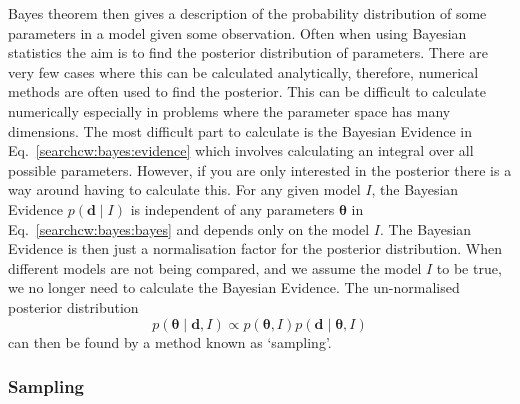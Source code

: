 Bayes theorem then gives a description of the probability distribution of some
parameters in a model given some observation.  Often when using Bayesian
statistics the aim is to find the posterior distribution of parameters.  There are
very few cases where this can be calculated analytically, therefore, numerical
methods are often used to find the posterior.  This
can be difficult to calculate numerically especially in problems where the
parameter space has many dimensions.  The most difficult part to calculate is
the Bayesian Evidence in Eq.~\ref{searchcw:bayes:evidence} which involves calculating an
integral over all possible parameters.  However, if you are only interested in the posterior there is a way around having
to calculate this.  For any given model $I$, the Bayesian Evidence $p({\bm d}\mid I)$ is
independent of any parameters ${\bm \theta}$ in
Eq.~\ref{searchcw:bayes:bayes} and depends only on the model $I$.
The Bayesian Evidence is then just a normalisation factor for the posterior
distribution.  When different models are not being compared, and we assume the
model $I$ to be true, we no longer need to calculate the Bayesian Evidence.  The
un-normalised posterior distribution
%
\begin{equation}
p({\bm \theta} \mid {\bm d}, I) \propto p({\bm \theta}, I)p({\bm d} \mid {\bm \theta}, I)
\end{equation}
can then be found by a method known as `sampling'.


\subsubsection{\label{searchcw:bayes:rejection}Sampling}

